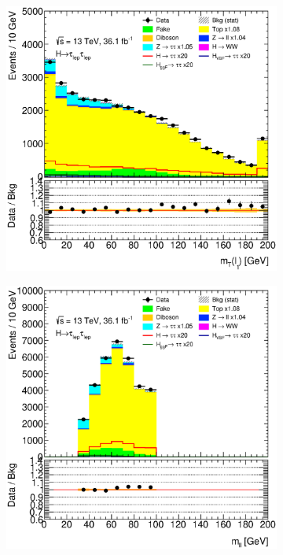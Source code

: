 \begin{figure}[htb]
\begin{subfigure}[t]{0.3\textwidth}
    \end{subfigure}
    \begin{subfigure}[t]{0.3\textwidth}
        \includegraphics[width=\textwidth]{./plots/mva/modeling/input_vars/BOOST_CR/ll-CutMVABoostedCatTopCR-MtLep0-lin.eps}
    \end{subfigure}
    \begin{subfigure}[t]{0.3\textwidth}
        \includegraphics[width=\textwidth]{./plots/mva/modeling/input_vars/BOOST_CR/ll-CutMVABoostedCatTopCR-mvis-lin.eps}

\end{subfigure}
\end{figure}
